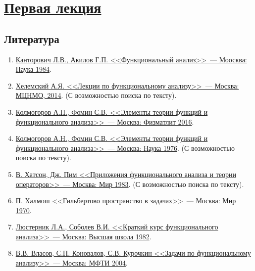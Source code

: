 \section{\href{https://www.youtube.com/watch?v=SLtFiLUWRgM}{Первая лекция}}


\subsection{Литература}
\begin{enumerate}
  \item \href{https://drive.google.com/file/d/1en8bCX1pxdGHvT-37Xes2CK9XKXtxa7V/view?usp=sharing}{Канторович Л.В., Акилов Г.П. <<Функциональный анализ>>~--- Моосква: Наука 1984}.
  \item \href{https://drive.google.com/file/d/1Ny26jtXW4qDnOeA7Tcvx9TnCK2o0I4yN/view?usp=sharing}{Хелемский А.Я. <<Лекции по функциональному анализу>>~--- Москва: МЦНМО, 2014}. (С возможностью поиска по тексту).
  \item \href{https://drive.google.com/file/d/1NXXC3uvq0ix1Kyp_c3uOi_m-qJWyrHQv/view?usp=sharing}{Колмогоров А.Н., Фомин С.В. <<Элементы теории функций и функционального анализа>>~--- Москва: Физматлит 2016}. 
  \item \href{https://drive.google.com/file/d/1va9Dxmkl9KvBeEK4zukIJxARB10AplSN/view?usp=sharing}{Колмогоров А.Н., Фомин С.В. <<Элементы теории функций и функционального анализа>>~--- Москва: Наука 1976}. (С возможностью поиска по тексту).
  \item \href{https://drive.google.com/file/d/1mc0k_E9obZmzqhkGpxUToK-o1nVR7lYb/view?usp=sharing}{В. Хатсон, Дж. Пим <<Приложения функционального анализа и теории операторов>>~--- Москва: Мир 1983}. (С возможностью поиска по тексту).
  \item \href{https://drive.google.com/file/d/1UpoxjknKkRnBcBwo7XIp8hzD8_xf5zGb/view?usp=sharing}{П. Халмош <<Гильбертово пространство в задачах>>~--- Москва: Мир 1970}.
  \item \href{https://drive.google.com/file/d/14OjPHyGs4-DaDAGViJCXzOEr9SnNyFBr/view?usp=sharing}{Люстерник Л.А., Соболев В.И.  <<Краткий курс функционального анализа>>~--- Москва: Высшая школа 1982}.
  \item \href{https://drive.google.com/file/d/1PKtGbebT_x9NW4HjXOZ-xPAEo9RnIs01/view?usp=sharing}{В.В. Власов, С.П. Коновалов, С.В. Курочкин <<Задачи по функциональному анализу>>~--- Москва: МФТИ 2004}.
\end{enumerate}
